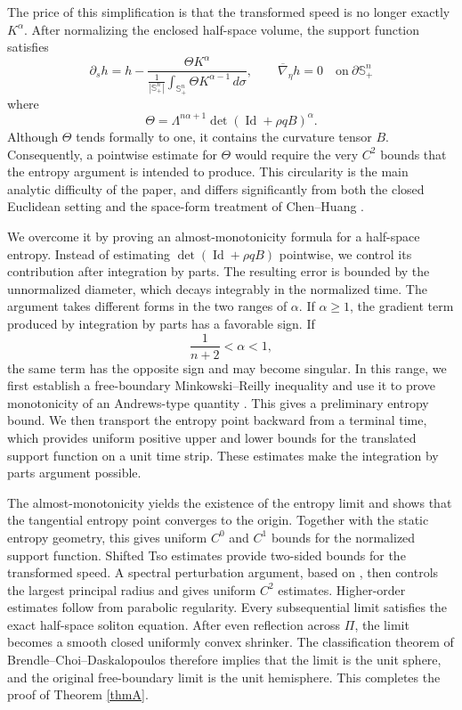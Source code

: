 \documentclass[11pt, reqno]{amsart}
\theoremstyle{remark}
\theoremstyle{definition}
\numberwithin{equation}{section}
\newcommand{\Id}{\operatorname{Id}}
\newcommand{\Sph}{\mathbb S}
\begin{document}
The price of this simplification is that the transformed speed is no
longer exactly $K^\alpha$. After
normalizing the enclosed half-space volume, the support function
satisfies
\begin{equation*}
    \partial_s h
    =
    h-
    \frac{\Theta K^\alpha}
    {\displaystyle
     \frac{1}{|\Sph^n_+|}
     \int_{\Sph^n_+}\Theta K^{\alpha-1}\,d\sigma},
    \qquad
    \overline{\nabla}_\eta h=0\quad \text{on}~\partial \mathbb{S}^n_+
\end{equation*}
where
\begin{equation*}
    \Theta
    =
    \Lambda^{n\alpha+1}
    \det(\Id+\rho qB)^\alpha.
\end{equation*}
Although $\Theta$ tends formally to one, it contains the curvature
tensor $B$. Consequently, a pointwise estimate for $\Theta$ would
require the very $C^2$ bounds that the entropy argument is intended
to produce. This circularity is the main analytic difficulty of the
paper, and differs significantly from both the closed Euclidean setting \cite{AGN2016,BCD2017,GN17} and the space-form treatment of Chen--Huang \cite{CH2024}.

We overcome it by proving an almost-monotonicity formula for a
half-space entropy. Instead of estimating
$\det(\Id+\rho qB)$ pointwise, we control its contribution after
integration by parts. The resulting error is bounded by the
unnormalized diameter, which decays integrably in the normalized time.
The argument takes different forms in the two ranges of $\alpha$. If
$\alpha\geq1$, the gradient term produced by integration by parts has
a favorable sign. If
\begin{equation*}
    \frac{1}{n+2}<\alpha<1,
\end{equation*}
the same term has the opposite sign and may become singular. In this
range, we first establish a free-boundary Minkowski--Reilly inequality
and use it to prove monotonicity of an Andrews-type quantity \cite[\S 4]{And00}. This
gives a preliminary entropy bound. We then transport the entropy point
backward from a terminal time, which provides uniform positive upper
and lower bounds for the translated support function on a unit time
strip. These estimates make the integration by parts argument
possible.

The almost-monotonicity yields the existence of the entropy limit and
shows that the tangential entropy point converges to the origin.
Together with the static entropy geometry, this gives uniform
$C^0$ and $C^1$ bounds for the normalized support function. Shifted
Tso estimates provide two-sided bounds for the transformed speed. A
spectral perturbation argument, based on
\cite[Lemma~5]{BCD2017}, then controls the largest principal radius and
gives uniform $C^2$ estimates. Higher-order estimates follow from
parabolic regularity. Every subsequential limit satisfies the exact
half-space soliton equation. After even reflection across $\Pi$, the
limit becomes a smooth closed uniformly convex shrinker. The
classification theorem of Brendle--Choi--Daskalopoulos \cite{BCD2017}
therefore implies that the limit is the unit sphere, and the original
free-boundary limit is the unit hemisphere. This completes the proof of Theorem \ref{thmA}.
\end{document}

